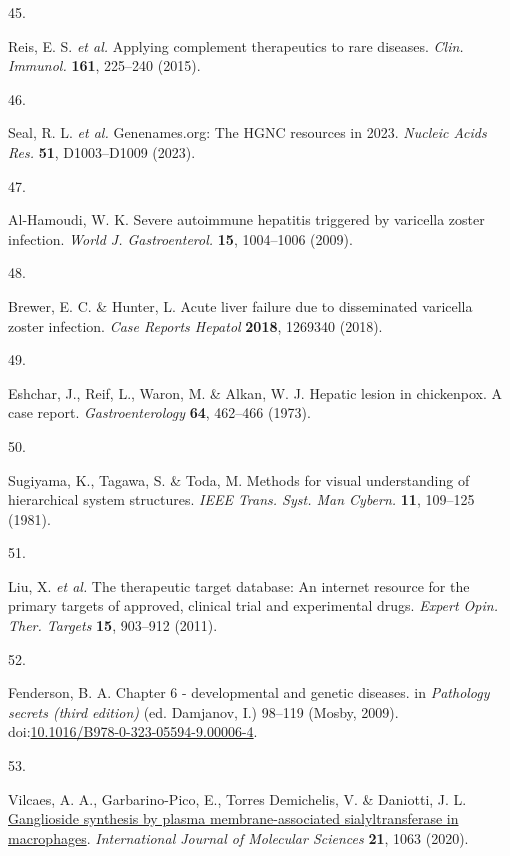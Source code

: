 \documentclass[
]{report}
\newlength{\cslhangindent}
\newlength{\csllabelwidth}
\newenvironment{CSLReferences}[2] %
 {\begin{list}{}{%
  \setlength{\itemindent}{0pt}
  \setlength{\leftmargin}{0pt}
  \setlength{\parsep}{0pt}
  \ifodd #1
   \setlength{\leftmargin}{\cslhangindent}
   \setlength{\itemindent}{-1\cslhangindent}
  \fi
  \setlength{\itemsep}{#2\baselineskip}}}
 {\end{list}}
\newcommand{\CSLLeftMargin}[1]{\parbox[t]{\csllabelwidth}{\strut#1\strut}}
\newcommand{\CSLRightInline}[1]{\parbox[t]{\linewidth - \csllabelwidth}{\strut#1\strut}}
\begin{document}
\begin{CSLReferences}{0}{0}
\CSLLeftMargin{45. }%
\CSLRightInline{Reis, E. S. \emph{et al.} Applying complement
therapeutics to rare diseases. \emph{Clin. Immunol.} \textbf{161},
225--240 (2015).}

\CSLLeftMargin{46. }%
\CSLRightInline{Seal, R. L. \emph{et al.} Genenames.org: The {HGNC}
resources in 2023. \emph{Nucleic Acids Res.} \textbf{51}, D1003--D1009
(2023).}

\CSLLeftMargin{47. }%
\CSLRightInline{Al-Hamoudi, W. K. Severe autoimmune hepatitis triggered
by varicella zoster infection. \emph{World J. Gastroenterol.}
\textbf{15}, 1004--1006 (2009).}

\CSLLeftMargin{48. }%
\CSLRightInline{Brewer, E. C. \& Hunter, L. Acute liver failure due to
disseminated varicella zoster infection. \emph{Case Reports Hepatol}
\textbf{2018}, 1269340 (2018).}

\CSLLeftMargin{49. }%
\CSLRightInline{Eshchar, J., Reif, L., Waron, M. \& Alkan, W. J. Hepatic
lesion in chickenpox. A case report. \emph{Gastroenterology}
\textbf{64}, 462--466 (1973).}

\CSLLeftMargin{50. }%
\CSLRightInline{Sugiyama, K., Tagawa, S. \& Toda, M. Methods for visual
understanding of hierarchical system structures. \emph{IEEE Trans. Syst.
Man Cybern.} \textbf{11}, 109--125 (1981).}

\CSLLeftMargin{51. }%
\CSLRightInline{Liu, X. \emph{et al.} The therapeutic target database:
An internet resource for the primary targets of approved, clinical trial
and experimental drugs. \emph{Expert Opin. Ther. Targets} \textbf{15},
903--912 (2011).}

\CSLLeftMargin{52. }%
\CSLRightInline{Fenderson, B. A. Chapter 6 - developmental and genetic
diseases. in \emph{Pathology secrets (third edition)} (ed. Damjanov, I.)
98--119 (Mosby, 2009).
doi:\href{https://doi.org/10.1016/B978-0-323-05594-9.00006-4}{10.1016/B978-0-323-05594-9.00006-4}.}

\CSLLeftMargin{53. }%
\CSLRightInline{Vilcaes, A. A., Garbarino-Pico, E., Torres Demichelis,
V. \& Daniotti, J. L.
\href{https://doi.org/10.3390/ijms21031063}{Ganglioside synthesis by
plasma membrane-associated sialyltransferase in macrophages}.
\emph{International Journal of Molecular Sciences} \textbf{21}, 1063
(2020).}


\end{CSLReferences}
\end{document}
